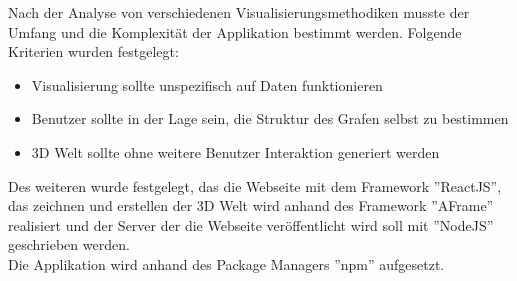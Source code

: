 
Nach der Analyse von verschiedenen Visualisierungsmethodiken musste der Umfang und die Komplexität der Applikation bestimmt werden.
Folgende Kriterien wurden festgelegt:
\begin{itemize}
    \item Visualisierung sollte unspezifisch auf Daten funktionieren
    \item Benutzer sollte in der Lage sein, die Struktur des Grafen selbst zu bestimmen
    \item 3D Welt sollte ohne weitere Benutzer Interaktion generiert werden
\end{itemize}
Des weiteren wurde festgelegt, das die Webseite mit dem Framework ''ReactJS'', das zeichnen und erstellen der 3D Welt wird anhand des Framework
''AFrame'' realisiert und der Server der die Webseite veröffentlicht wird soll mit ''NodeJS'' geschrieben werden. \\
Die Applikation wird anhand des Package Managers ''npm'' aufgesetzt.

